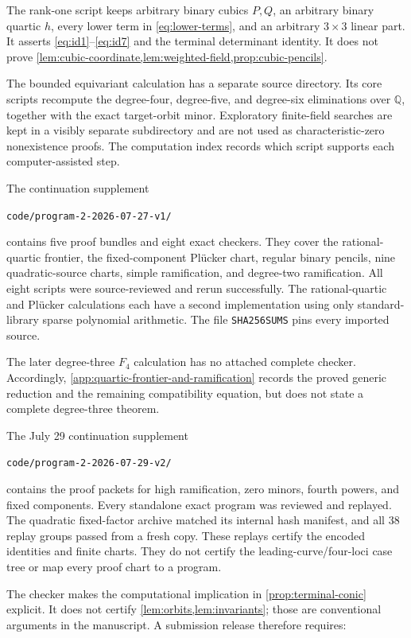 \documentclass[11pt,reqno]{amsart}
\begin{document}
The rank-one script keeps arbitrary binary cubics \(P,Q\), an arbitrary
binary quartic \(h\), every lower term in \eqref{eq:lower-terms}, and an
arbitrary \(3\times3\) linear part.  It asserts
\eqref{eq:id1}--\eqref{eq:id7} and the terminal determinant identity.
It does not prove
\cref{lem:cubic-coordinate,lem:weighted-field,prop:cubic-pencils}.

The bounded equivariant calculation has a separate source directory.  Its
core scripts recompute the degree-four, degree-five, and degree-six
eliminations over \(\mathbb Q\), together with the exact target-orbit minor.
Exploratory finite-field searches are kept in a visibly separate subdirectory
and are not used as characteristic-zero nonexistence proofs.  The computation
index records which script supports each computer-assisted step.

The continuation supplement
\begin{center}
\texttt{code/program-2-2026-07-27-v1/}
\end{center}
contains five proof bundles and eight exact checkers.  They cover the
rational-quartic frontier, the fixed-component Pl\"ucker chart, regular
binary pencils, nine quadratic-source charts, simple ramification, and
degree-two ramification.  All eight scripts were source-reviewed and rerun
successfully.  The rational-quartic and Pl\"ucker calculations each have a
second implementation using only standard-library sparse polynomial
arithmetic.  The file \texttt{SHA256SUMS} pins every imported source.

The later degree-three \(F_4\) calculation has no attached complete checker.
Accordingly, \cref{app:quartic-frontier-and-ramification} records the proved
generic reduction and the remaining compatibility equation, but does not
state a complete degree-three theorem.

The July 29 continuation supplement
\begin{center}
\texttt{code/program-2-2026-07-29-v2/}
\end{center}
contains the proof packets for high ramification, zero minors, fourth powers,
and fixed components.  Every standalone exact program was reviewed and replayed.
The quadratic fixed-factor archive matched its internal hash manifest, and
all 38 replay groups passed from a fresh copy.  These replays certify the
encoded identities and finite charts.  They do not certify the
leading-curve/four-loci case tree or map every proof chart to a program.

The checker makes the computational implication in
\cref{prop:terminal-conic} explicit.  It does not certify
\cref{lem:orbits,lem:invariants}; those are conventional arguments in the
manuscript.  A submission release therefore requires:
\end{document}
